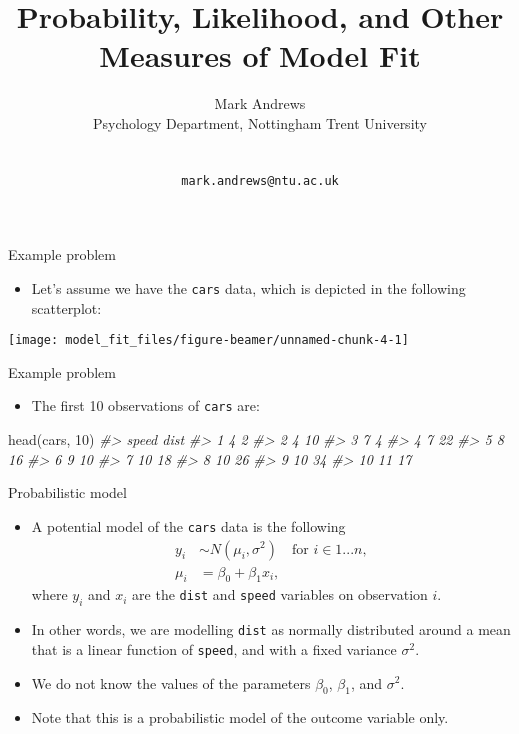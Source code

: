 \documentclass[
  10pt,
  ignorenonframetext,
]{beamer}
\title{Probability, Likelihood, and Other Measures of Model Fit}
\author{Mark Andrews\\
Psychology Department, Nottingham Trent University\\
\strut \\
\texttt{mark.andrews@ntu.ac.uk}}
\date{}
\newenvironment{Shaded}{\begin{snugshade}}{\end{snugshade}}
\newcommand{\CommentTok}[1]{\textcolor[rgb]{0.56,0.35,0.01}{\textit{#1}}}
\newcommand{\DecValTok}[1]{\textcolor[rgb]{0.00,0.00,0.81}{#1}}
\newcommand{\FunctionTok}[1]{\textcolor[rgb]{0.00,0.00,0.00}{#1}}
\newcommand{\NormalTok}[1]{#1}
\providecommand{\tightlist}{%
  \setlength{\itemsep}{0pt}\setlength{\parskip}{0pt}}
\begin{document}
\frame{\titlepage}

\begin{frame}[fragile]{Example problem}
\protect\hypertarget{example-problem}{}
\begin{itemize}
\tightlist
\item
  Let's assume we have the \texttt{cars} data, which is depicted in the
  following scatterplot:
\end{itemize}

\begin{center}\texttt{[image: model\_fit\_files/figure-beamer/unnamed-chunk-4-1]} \end{center}
\end{frame}

\begin{frame}[fragile]{Example problem}
\protect\hypertarget{example-problem-1}{}
\begin{itemize}
\tightlist
\item
  The first 10 observations of \texttt{cars} are:
\end{itemize}

\begin{Shaded}
\begin{Highlighting}[]
\FunctionTok{head}\NormalTok{(cars, }\DecValTok{10}\NormalTok{)}
\CommentTok{\#\textgreater{}    speed dist}
\CommentTok{\#\textgreater{} 1      4    2}
\CommentTok{\#\textgreater{} 2      4   10}
\CommentTok{\#\textgreater{} 3      7    4}
\CommentTok{\#\textgreater{} 4      7   22}
\CommentTok{\#\textgreater{} 5      8   16}
\CommentTok{\#\textgreater{} 6      9   10}
\CommentTok{\#\textgreater{} 7     10   18}
\CommentTok{\#\textgreater{} 8     10   26}
\CommentTok{\#\textgreater{} 9     10   34}
\CommentTok{\#\textgreater{} 10    11   17}
\end{Highlighting}
\end{Shaded}
\end{frame}

\begin{frame}[fragile]{Probabilistic model}
\protect\hypertarget{probabilistic-model}{}
\begin{itemize}
\item
  A potential model of the \texttt{cars} data is the following \[
  \begin{aligned}
  y_i &\sim N(\mu_i, \sigma^2)\quad \text{for $i \in 1...n$},\\
  \mu_i &= \beta_0 + \beta_1 x_i,
  \end{aligned}
  \] where \(y_i\) and \(x_i\) are the \texttt{dist} and \texttt{speed}
  variables on observation \(i\).
\item
  In other words, we are modelling \texttt{dist} as normally distributed
  around a mean that is a linear function of \texttt{speed}, and with a
  fixed variance \(\sigma^2\).
\item
  We do not know the values of the parameters \(\beta_0\), \(\beta_1\),
  and \(\sigma^2\).
\item
  Note that this is a probabilistic model of the outcome variable only.
\end{itemize}
\end{frame}
\end{document}
